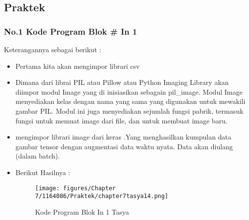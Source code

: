 \subsection{Praktek}
\subsubsection{No.1 Kode Program Blok \# In 1}

Keterangannya sebagai berikut :
\begin{itemize}
\item Pertama kita akan mengimpor librari csv
\item Dimana dari librai PIL atau Pillow atau Python Imaging Library akan diimpor modul Image yang di inisiasikan sebagain pil\_image. Modul Image menyediakan kelas dengan nama yang sama yang digunakan untuk mewakili gambar PIL. Modul ini juga menyediakan sejumlah fungsi pabrik, termasuk fungsi untuk memuat image dari file, dan untuk membuat image baru.
\item mengimpor librari image dari keras .Yang menghasilkan kumpulan data gambar tensor dengan augmentasi data waktu nyata. Data akan diulang (dalam batch). 
\item Berikut Hasilnya :
\begin{figure}[ht]
\centering
\texttt{[image: figures/Chapter 7/1164086/Praktek/chapter7tasya14.png]}
\caption{Kode Program Blok In 1 Tasya}
\label{Praktek}
\end{figure}
\end{itemize}

